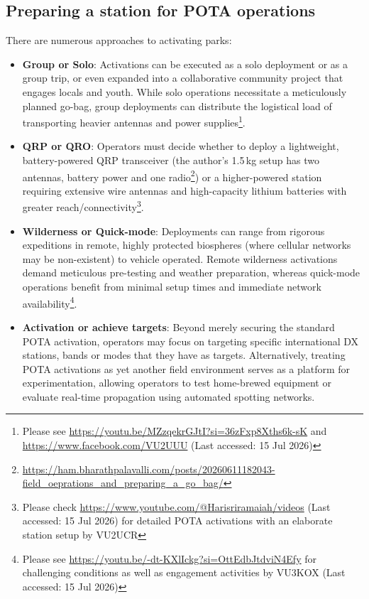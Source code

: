\documentclass[conference]{IEEEtran}
\begin{document}
\subsection{Preparing a station for POTA operations}
\label{subsection:station}
There are numerous approaches to activating parks:
\begin{itemize}
\item \textbf{Group or Solo}: Activations can be executed as a
  solo deployment or as a group trip, or even expanded into a
  collaborative community project that engages locals and youth. While
  solo operations necessitate a meticulously planned go-bag, group
  deployments can distribute the logistical load of transporting
  heavier antennas and power supplies\footnote{Please see
    \url{https://youtu.be/MZzqekrGJtI?si=36zFxp8Xths6k-sK} and
    \url{https://www.facebook.com/VU2UUU} (Last accessed: 15 Jul 2026)}.
\item \textbf{QRP or QRO}:  Operators must decide whether to deploy a
  lightweight, battery-powered QRP transceiver (the author's 1.5\,kg
  setup has two antennas, battery power and one
  radio\footnote{\url{https://ham.bharathpalavalli.com/posts/20260611182043-field_oeprations_and_preparing_a_go_bag/}}) or a higher-powered station requiring extensive
  wire antennas and high-capacity lithium batteries with greater
  reach/connectivity\footnote{Please check
    \url{https://www.youtube.com/@Harisriramaiah/videos} (Last accessed: 15
    Jul 2026) for detailed POTA activations with an elaborate station
    setup by VU2UCR}.
\item \textbf{Wilderness or Quick-mode}: Deployments can range from
  rigorous expeditions in remote, highly protected biospheres (where
  cellular networks may be non-existent) to vehicle operated. Remote
  wilderness activations demand meticulous pre-testing and weather
  preparation, whereas quick-mode operations benefit from minimal
  setup times and immediate network availability\footnote{Please see
    \url{https://youtu.be/-dt-KXlIckg?si=OttEdbJtdviN4Efy} for challenging
    conditions as well as engagement activities by VU3KOX (Last
    accessed: 15 Jul 2026)}.
\item \textbf{Activation or achieve targets}: Beyond merely securing
  the standard POTA activation, operators may focus on targeting
  specific international DX stations, bands or modes that they have as
  targets. Alternatively, treating POTA activations as yet another
  field environment serves as a platform for experimentation,
  allowing operators to test home-brewed equipment or evaluate
  real-time propagation using automated spotting
  networks.
\end{itemize}
\end{document}

